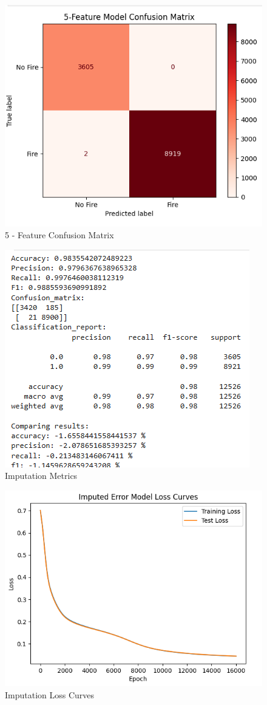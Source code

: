 \documentclass[conference]{IEEEtran}
\begin{document}
\begin{figure}
    \centering
    \includegraphics[width=0.75\linewidth]{images/5CM.png}
    \caption{5 - Feature Confusion Matrix}
    \label{fig:4.2}
\end{figure}

\begin{figure}
    \centering
    \includegraphics[width=0.75\linewidth]{images/imputationmetric.png}
    \caption{Imputation Metrics}
    \label{fig:5.0}
\end{figure}
\begin{figure}
    \centering
    \includegraphics[width=0.75\linewidth]{images/ImputationLC.png}
    \caption{Imputation Loss Curves}
    \label{fig:5.1}
\end{figure}
\end{document}
